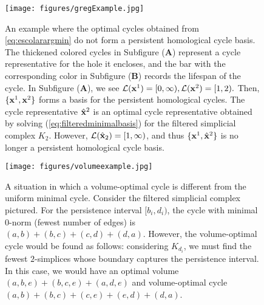 \begin{figure}[h!]
\begin{center}
\texttt{[image: figures/gregExample.jpg]}
\end{center}
\caption{An example where the optimal cycles obtained from \pr \eqref{eq:escolarargmin} do not form a persistent homological cycle basis. The thickened colored cycles in Subfigure (\textbf{A}) represent a cycle representative for the hole it encloses, and the bar with the corresponding color in Subfigure (\textbf{B}) records the lifespan of the cycle. In Subfigure (\textbf{A}), we see $\mathcal{L}(\mathbf{x}^1) = [0,\infty), \mathcal{L}(\mathbf{x}^2) = [1,2).$ Then, $\{\mathbf{x}^1, \mathbf{x}^2\}$ forms a basis for the persistent homological cycles. The cycle representative $\hat {\mathbf{x}}^2$ is an optimal cycle representative obtained by solving \pr (\ref{eq:filteredminimalbasis}) for the filtered simplicial complex $K_2$. However, $\mathcal{L}(\hat {\mathbf{x}}_2) = [1, \infty)$, and thus  $\{\mathbf{x}^1, \hat {\mathbf{x}}^2\}$ is no longer a persistent homological cycle basis.} \label{fig:example-persBasis}
\end{figure}


 \begin{figure}[h!]
\begin{center}
\texttt{[image: figures/volumeexample.jpg]}
\end{center}
\caption{A situation in which a volume-optimal cycle is different from the uniform minimal cycle. Consider the filtered simplicial complex pictured. For the persistence interval $[b_i,d_i)$, the cycle with minimal $0$-norm (fewest number of edges) is $(a,b) + (b,c) + (c,d)  + (d,a)$.
However, the volume-optimal cycle would be found as follows: considering $K_{d_i}$, we must find the fewest $2$-simplices whose boundary captures the persistence interval. In this case, we would have an optimal volume $(a,b,e) + (b,c,e) + (a,d,e)$ and volume-optimal cycle $(a,b) + (b,c) + (c,e) + (e,d) + (d,a)$. 
}\label{fig:volumeoptimal}
\end{figure} 

